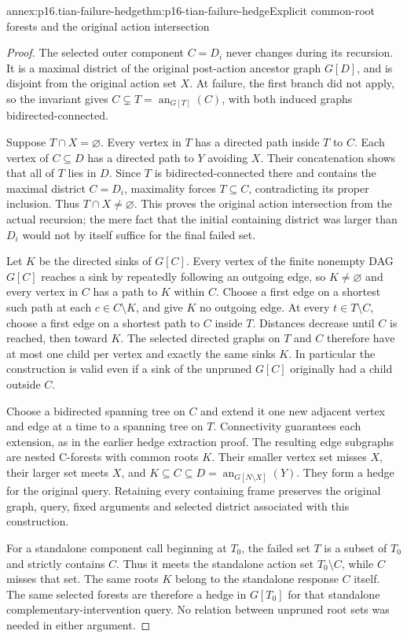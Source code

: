 \begin{annexitem}{annex:p16.tian-failure-hedge}{thm:p16-tian-failure-hedge}{Explicit common-root forests and the original action intersection}
\begin{proof}
The selected outer component \(C=D_i\) never changes during
its recursion. It is a maximal district of the original post-action
ancestor graph \(G[D]\), and is disjoint from the original
action set \(X\). At failure, the first branch did not apply,
so the invariant gives
\(C\subsetneq T=\operatorname{an}_{G[T]}(C)\), with both
induced graphs bidirected-connected.

Suppose \(T\cap X=\varnothing\). Every vertex in \(T\)
has a directed path inside \(T\) to \(C\). Each vertex
of \(C\subseteq D\) has a directed path to \(Y\) avoiding
\(X\). Their concatenation shows that all of \(T\) lies
in \(D\). Since \(T\) is bidirected-connected there and
contains the maximal district \(C=D_i\), maximality forces
\(T\subseteq C\), contradicting its proper inclusion. Thus
\(T\cap X\ne\varnothing\). This proves the original action
intersection from the actual recursion; the mere fact that the
initial containing district was larger than \(D_i\) would not
by itself suffice for the final failed set.

Let \(K\) be the directed sinks of \(G[C]\). Every vertex
of the finite nonempty DAG \(G[C]\) reaches a sink by repeatedly
following an outgoing edge, so \(K\ne\varnothing\) and every
vertex in \(C\) has a path to \(K\) within \(C\).
Choose a first edge on a shortest such path at each \(c\in C\setminus K\),
and give \(K\) no outgoing edge. At every \(t\in T\setminus C\),
choose a first edge on a shortest path to \(C\) inside \(T\).
Distances decrease until \(C\) is reached, then toward \(K\).
The selected directed graphs on \(T\) and \(C\) therefore
have at most one child per vertex and exactly the same sinks \(K\).
In particular the construction is valid even if a sink of the
unpruned \(G[C]\) originally had a child outside \(C\).

Choose a bidirected spanning tree on \(C\) and extend it
one new adjacent vertex and edge at a time to a spanning tree
on \(T\). Connectivity guarantees each extension, as in the
earlier hedge extraction proof. The resulting edge subgraphs are
nested C-forests with common roots \(K\). Their smaller vertex
set misses \(X\), their larger set meets \(X\), and
\(K\subseteq C\subseteq D=\operatorname{an}_{G[N\setminus X]}(Y)\).
They form a hedge for the original query. Retaining every containing
frame preserves the original graph, query, fixed arguments and
selected district associated with this construction.

For a standalone component call beginning at \(T_0\), the
failed set \(T\) is a subset of \(T_0\) and strictly contains
\(C\). Thus it meets the standalone action set \(T_0\setminus C\),
while \(C\) misses that set. The same roots \(K\) belong
to the standalone response \(C\) itself. The same selected
forests are therefore a hedge in \(G[T_0]\) for that standalone
complementary-intervention query. No relation between unpruned
root sets was needed in either argument.
\end{proof}
\end{annexitem}

